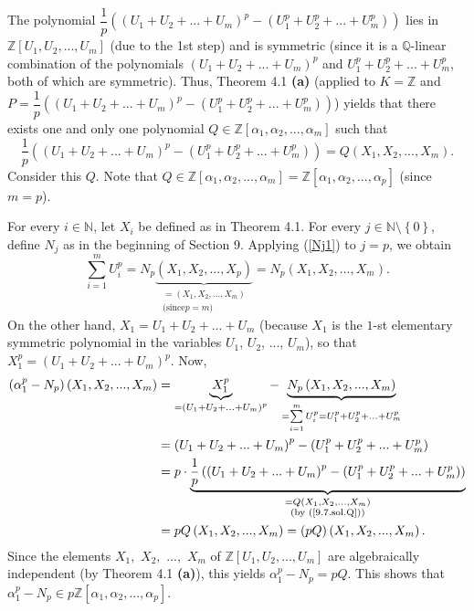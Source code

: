 \documentclass[numbers=enddot,12pt,final,onecolumn,notitlepage]{scrartcl}%
\begin{document}
The polynomial $\dfrac{1}{p}\left(  \left(  U_{1}+U_{2}+...+U_{m}\right)
^{p}-\left(  U_{1}^{p}+U_{2}^{p}+...+U_{m}^{p}\right)  \right)  $ lies in
$\mathbb{Z}\left[  U_{1},U_{2},...,U_{m}\right]  $ (due to the 1st step) and
is symmetric (since it is a $\mathbb{Q}$-linear combination of the polynomials
$\left(  U_{1}+U_{2}+...+U_{m}\right)  ^{p}$ and $U_{1}^{p}+U_{2}%
^{p}+...+U_{m}^{p}$, both of which are symmetric). Thus, Theorem 4.1
\textbf{(a)} (applied to $K=\mathbb{Z}$ and $P=\dfrac{1}{p}\left(  \left(
U_{1}+U_{2}+...+U_{m}\right)  ^{p}-\left(  U_{1}^{p}+U_{2}^{p}+...+U_{m}%
^{p}\right)  \right)  $) yields that there exists one and only one polynomial
$Q\in\mathbb{Z}\left[  \alpha_{1},\alpha_{2},...,\alpha_{m}\right]  $ such
that%
\begin{equation}
\dfrac{1}{p}\left(  \left(  U_{1}+U_{2}+...+U_{m}\right)  ^{p}-\left(
U_{1}^{p}+U_{2}^{p}+...+U_{m}^{p}\right)  \right)  =Q\left(  X_{1}%
,X_{2},...,X_{m}\right)  . \label{9.7.sol.Q}%
\end{equation}
Consider this $Q$. Note that $Q\in\mathbb{Z}\left[  \alpha_{1},\alpha
_{2},...,\alpha_{m}\right]  =\mathbb{Z}\left[  \alpha_{1},\alpha
_{2},...,\alpha_{p}\right]  $ (since $m=p$).

For every $i\in\mathbb{N}$, let $X_{i}$ be defined as in Theorem 4.1. For
every $j\in\mathbb{N}\setminus\left\{  0\right\}  $, define $N_{j}$ as in the
beginning of Section 9. Applying (\ref{Nj1}) to $j=p$, we obtain%
\[
\sum_{i=1}^{m}U_{i}^{p}=N_{p}\underbrace{\left(  X_{1},X_{2},...,X_{p}\right)
}_{\substack{=\left(  X_{1},X_{2},...,X_{m}\right)  \\\text{(since
}p=m\text{)}}}=N_{p}\left(  X_{1},X_{2},...,X_{m}\right)  .
\]
On the other hand, $X_{1}=U_{1}+U_{2}+...+U_{m}$ (because $X_{1}$ is the
$1$-st elementary symmetric polynomial in the variables $U_{1}$, $U_{2}$,
$...$, $U_{m}$), so that $X_{1}^{p}=\left(  U_{1}+U_{2}+...+U_{m}\right)
^{p}$. Now,%
\begin{align*}
\left(  \alpha_{1}^{p}-N_{p}\right)  \left(  X_{1},X_{2},...,X_{m}\right)   &
=\underbrace{X_{1}^{p}}_{=\left(  U_{1}+U_{2}+...+U_{m}\right)  ^{p}%
}-\underbrace{N_{p}\left(  X_{1},X_{2},...,X_{m}\right)  }_{=\sum
\limits_{i=1}^{m}U_{i}^{p}=U_{1}^{p}+U_{2}^{p}+...+U_{m}^{p}}\\
&  =\left(  U_{1}+U_{2}+...+U_{m}\right)  ^{p}-\left(  U_{1}^{p}+U_{2}%
^{p}+...+U_{m}^{p}\right) \\
&  =p\cdot\underbrace{\dfrac{1}{p}\left(  \left(  U_{1}+U_{2}+...+U_{m}%
\right)  ^{p}-\left(  U_{1}^{p}+U_{2}^{p}+...+U_{m}^{p}\right)  \right)
}_{\substack{=Q\left(  X_{1},X_{2},...,X_{m}\right)  \\\text{(by
(\ref{9.7.sol.Q}))}}}\\
&  =pQ\left(  X_{1},X_{2},...,X_{m}\right)  =\left(  pQ\right)  \left(
X_{1},X_{2},...,X_{m}\right)  .
\end{align*}
Since the elements $X_{1},$ $X_{2},$ $...,$ $X_{m}$ of $\mathbb{Z}\left[
U_{1},U_{2},...,U_{m}\right]  $ are algebraically independent (by Theorem 4.1
\textbf{(a)}), this yields $\alpha_{1}^{p}-N_{p}=pQ$. This shows that
$\alpha_{1}^{p}-N_{p}\in p\mathbb{Z}\left[  \alpha_{1},\alpha_{2}%
,...,\alpha_{p}\right]  $.
\end{document}
